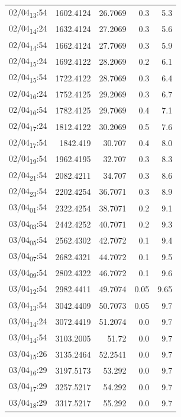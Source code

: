 \documentclass[11pt]{article}
\begin{document}
\begin{center}
\begin{tabular}{lrrrr}
02/04\textsubscript{13}:54 & 1602.4124 & 26.7069 & 0.3 & 5.3\\[0pt]
02/04\textsubscript{14}:24 & 1632.4124 & 27.2069 & 0.3 & 5.6\\[0pt]
02/04\textsubscript{14}:54 & 1662.4124 & 27.7069 & 0.3 & 5.9\\[0pt]
02/04\textsubscript{15}:24 & 1692.4122 & 28.2069 & 0.2 & 6.1\\[0pt]
02/04\textsubscript{15}:54 & 1722.4122 & 28.7069 & 0.3 & 6.4\\[0pt]
02/04\textsubscript{16}:24 & 1752.4125 & 29.2069 & 0.3 & 6.7\\[0pt]
02/04\textsubscript{16}:54 & 1782.4125 & 29.7069 & 0.4 & 7.1\\[0pt]
02/04\textsubscript{17}:24 & 1812.4122 & 30.2069 & 0.5 & 7.6\\[0pt]
02/04\textsubscript{17}:54 & 1842.419 & 30.707 & 0.4 & 8.0\\[0pt]
02/04\textsubscript{19}:54 & 1962.4195 & 32.707 & 0.3 & 8.3\\[0pt]
02/04\textsubscript{21}:54 & 2082.4211 & 34.707 & 0.3 & 8.6\\[0pt]
02/04\textsubscript{23}:54 & 2202.4254 & 36.7071 & 0.3 & 8.9\\[0pt]
03/04\textsubscript{01}:54 & 2322.4254 & 38.7071 & 0.2 & 9.1\\[0pt]
03/04\textsubscript{03}:54 & 2442.4252 & 40.7071 & 0.2 & 9.3\\[0pt]
03/04\textsubscript{05}:54 & 2562.4302 & 42.7072 & 0.1 & 9.4\\[0pt]
03/04\textsubscript{07}:54 & 2682.4321 & 44.7072 & 0.1 & 9.5\\[0pt]
03/04\textsubscript{09}:54 & 2802.4322 & 46.7072 & 0.1 & 9.6\\[0pt]
03/04\textsubscript{12}:54 & 2982.4411 & 49.7074 & 0.05 & 9.65\\[0pt]
03/04\textsubscript{13}:54 & 3042.4409 & 50.7073 & 0.05 & 9.7\\[0pt]
03/04\textsubscript{14}:24 & 3072.4419 & 51.2074 & 0.0 & 9.7\\[0pt]
03/04\textsubscript{14}:54 & 3103.2005 & 51.72 & 0.0 & 9.7\\[0pt]
03/04\textsubscript{15}:26 & 3135.2464 & 52.2541 & 0.0 & 9.7\\[0pt]
03/04\textsubscript{16}:29 & 3197.5173 & 53.292 & 0.0 & 9.7\\[0pt]
03/04\textsubscript{17}:29 & 3257.5217 & 54.292 & 0.0 & 9.7\\[0pt]
03/04\textsubscript{18}:29 & 3317.5217 & 55.292 & 0.0 & 9.7\\[0pt]
\end{tabular}
\end{center}
\end{document}
